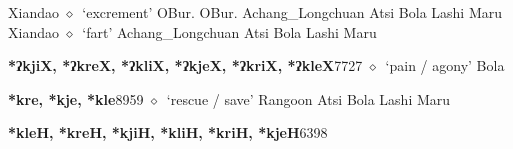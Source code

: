 \begin{list}{}{\leftmargin=1.5em \itemindent=-1.5em}
         Xiandao 
\hspace{1ex}
         $\diamond$~`excrement'
         OBur. 
\hspace{1ex}
         OBur. 
\hspace{1ex}
         Achang\_Longchuan 
\hspace{1ex}
         Atsi 
\hspace{1ex}
         Bola 
\hspace{1ex}
         Lashi 
\hspace{1ex}
         Maru 
\hspace{1ex}
         Xiandao 
\hspace{1ex}
         $\diamond$~`fart'
         Achang\_Longchuan 
\hspace{1ex}
         Atsi 
\hspace{1ex}
         Bola 
\hspace{1ex}
         Lashi 
\hspace{1ex}
         Maru 
  \item {\footnotesize \textbf{*ʔkjiX, *ʔkreX, *ʔkliX, *ʔkjeX, *ʔkriX, *ʔkleX}}{\tiny 7727}
\hspace{1ex}
         $\diamond$~`pain / agony'
         Bola 
  \item {\footnotesize \textbf{*kre, *kje, *kle}}{\tiny 8959}
\hspace{1ex}
         $\diamond$~`rescue / save'
         Rangoon 
\hspace{1ex}
         Atsi 
\hspace{1ex}
         Bola 
\hspace{1ex}
         Lashi 
\hspace{1ex}
         Maru 
  \item {\footnotesize \textbf{*kleH, *kreH, *kjiH, *kliH, *kriH, *kjeH}}{\tiny 6398}
\hspace{1ex}

\end{list}
